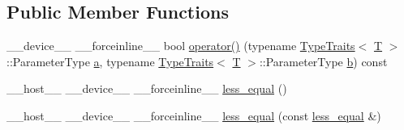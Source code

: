 \subsection*{Public Member Functions}
\begin{DoxyCompactItemize}
\item 
\-\_\-\-\_\-device\-\_\-\-\_\- \-\_\-\-\_\-forceinline\-\_\-\-\_\- bool \hyperlink{structcv_1_1gpu_1_1device_1_1less__equal_ab37ecaf10f4d62f66debc4165c2c220c}{operator()} (typename \hyperlink{structcv_1_1gpu_1_1device_1_1TypeTraits}{Type\-Traits}$<$ \hyperlink{calib3d_8hpp_a3efb9551a871ddd0463079a808916717}{T} $>$\-::Parameter\-Type \hyperlink{legacy_8hpp_a1031d0e0a97a340abfe0a6ab9e831045}{a}, typename \hyperlink{structcv_1_1gpu_1_1device_1_1TypeTraits}{Type\-Traits}$<$ \hyperlink{calib3d_8hpp_a3efb9551a871ddd0463079a808916717}{T} $>$\-::Parameter\-Type \hyperlink{legacy_8hpp_ac04272e8ca865b8fba18d36edae9fd2a}{b}) const 
\item 
\-\_\-\-\_\-host\-\_\-\-\_\- \-\_\-\-\_\-device\-\_\-\-\_\- \-\_\-\-\_\-forceinline\-\_\-\-\_\- \hyperlink{structcv_1_1gpu_1_1device_1_1less__equal_a8ed54b04e012a029d3ae2f5dbe1f53c2}{less\-\_\-equal} ()
\item 
\-\_\-\-\_\-host\-\_\-\-\_\- \-\_\-\-\_\-device\-\_\-\-\_\- \-\_\-\-\_\-forceinline\-\_\-\-\_\- \hyperlink{structcv_1_1gpu_1_1device_1_1less__equal_a1d78b1944e1a9a4d5c091efc445875b7}{less\-\_\-equal} (const \hyperlink{structcv_1_1gpu_1_1device_1_1less__equal}{less\-\_\-equal} \&)
\end{DoxyCompactItemize}


